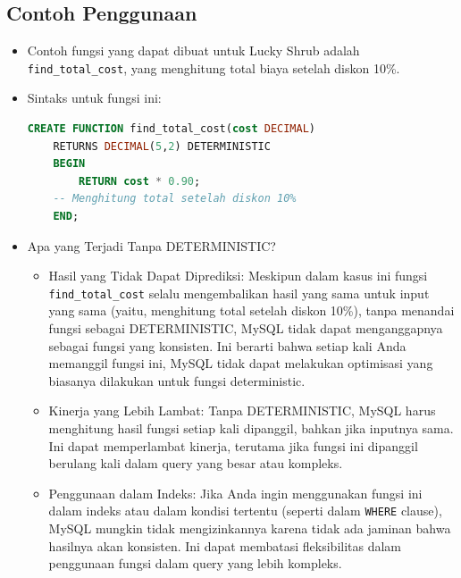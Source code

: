 \documentclass{article}
\begin{document}
\subsection{Contoh Penggunaan}
\begin{itemize}
    \item Contoh fungsi yang dapat dibuat untuk Lucky Shrub adalah \verb|find_total_cost|, yang menghitung total biaya setelah diskon 10\%.
    \item Sintaks untuk fungsi ini:
          \begin{lstlisting}[language=SQL, caption={}, captionpos=b]
CREATE FUNCTION find_total_cost(cost DECIMAL)
    RETURNS DECIMAL(5,2) DETERMINISTIC
    BEGIN
        RETURN cost * 0.90; 
    -- Menghitung total setelah diskon 10%
    END;
\end{lstlisting}
    \item Apa yang Terjadi Tanpa DETERMINISTIC?
          \begin{itemize}
              \item Hasil yang Tidak Dapat Diprediksi: Meskipun dalam kasus ini fungsi \verb|find_total_cost| selalu mengembalikan hasil yang sama untuk input yang sama (yaitu, menghitung total setelah diskon 10\%), tanpa menandai fungsi sebagai DETERMINISTIC, MySQL tidak dapat menganggapnya sebagai fungsi yang konsisten. Ini berarti bahwa setiap kali Anda memanggil fungsi ini, MySQL tidak dapat melakukan optimisasi yang biasanya dilakukan untuk fungsi deterministic.
              \item Kinerja yang Lebih Lambat: Tanpa DETERMINISTIC, MySQL harus menghitung hasil fungsi setiap kali dipanggil, bahkan jika inputnya sama. Ini dapat memperlambat kinerja, terutama jika fungsi ini dipanggil berulang kali dalam query yang besar atau kompleks.
              \item Penggunaan dalam Indeks: Jika Anda ingin menggunakan fungsi ini dalam indeks atau dalam kondisi tertentu (seperti dalam \verb|WHERE| clause), MySQL mungkin tidak mengizinkannya karena tidak ada jaminan bahwa hasilnya akan konsisten. Ini dapat membatasi fleksibilitas dalam penggunaan fungsi dalam query yang lebih kompleks.
          \end{itemize}
\end{itemize}
\end{document}
